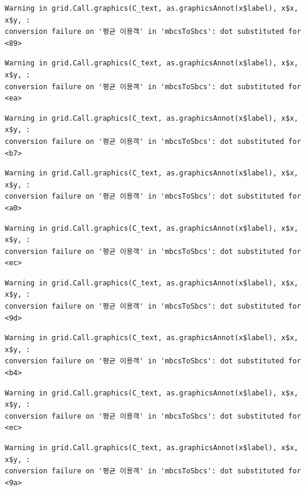 \documentclass[
  letterpaper,
  DIV=11,
  numbers=noendperiod]{scrreprt}
\begin{document}
\begin{verbatim}
Warning in grid.Call.graphics(C_text, as.graphicsAnnot(x$label), x$x, x$y, :
conversion failure on '평균 이용객' in 'mbcsToSbcs': dot substituted for <89>
\end{verbatim}

\begin{verbatim}
Warning in grid.Call.graphics(C_text, as.graphicsAnnot(x$label), x$x, x$y, :
conversion failure on '평균 이용객' in 'mbcsToSbcs': dot substituted for <ea>
\end{verbatim}

\begin{verbatim}
Warning in grid.Call.graphics(C_text, as.graphicsAnnot(x$label), x$x, x$y, :
conversion failure on '평균 이용객' in 'mbcsToSbcs': dot substituted for <b7>
\end{verbatim}

\begin{verbatim}
Warning in grid.Call.graphics(C_text, as.graphicsAnnot(x$label), x$x, x$y, :
conversion failure on '평균 이용객' in 'mbcsToSbcs': dot substituted for <a0>
\end{verbatim}

\begin{verbatim}
Warning in grid.Call.graphics(C_text, as.graphicsAnnot(x$label), x$x, x$y, :
conversion failure on '평균 이용객' in 'mbcsToSbcs': dot substituted for <ec>
\end{verbatim}

\begin{verbatim}
Warning in grid.Call.graphics(C_text, as.graphicsAnnot(x$label), x$x, x$y, :
conversion failure on '평균 이용객' in 'mbcsToSbcs': dot substituted for <9d>
\end{verbatim}

\begin{verbatim}
Warning in grid.Call.graphics(C_text, as.graphicsAnnot(x$label), x$x, x$y, :
conversion failure on '평균 이용객' in 'mbcsToSbcs': dot substituted for <b4>
\end{verbatim}

\begin{verbatim}
Warning in grid.Call.graphics(C_text, as.graphicsAnnot(x$label), x$x, x$y, :
conversion failure on '평균 이용객' in 'mbcsToSbcs': dot substituted for <ec>
\end{verbatim}

\begin{verbatim}
Warning in grid.Call.graphics(C_text, as.graphicsAnnot(x$label), x$x, x$y, :
conversion failure on '평균 이용객' in 'mbcsToSbcs': dot substituted for <9a>
\end{verbatim}
\end{document}
